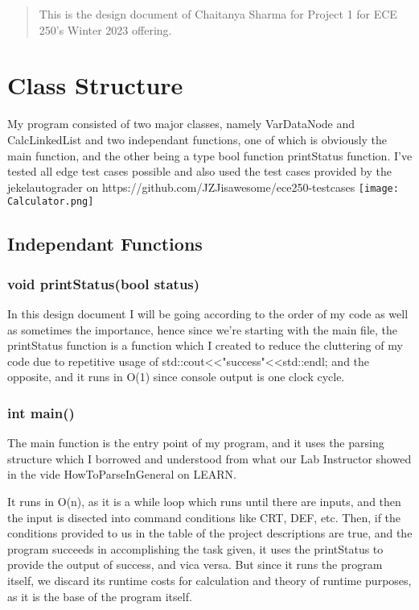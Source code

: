 \begin{abstract}
    This is the design document of Chaitanya Sharma 
    for Project 1 for ECE 250's Winter 2023 offering.
\end{abstract}
\section{Class Structure}
    My program consisted of two major classes, namely {\color{draculapurple}VarDataNode} and 
    {\color{draculapurple}CalcLinkedList} and two independant functions, 
    one of which is obviously the {\color{draculapurple}main} function, and the other being a type 
    bool function {\color{draculapurple}printStatus} function. I've tested all edge test cases possible and also used the test cases provided by the jekelautograder on https://github.com/JZJisawesome/ece250-testcases
    \newline
    \texttt{[image: Calculator.png]}
    \subsection{\color{lightgray}Independant Functions}
    \subsubsection{{\color{orange}void} {\color{draculapurple}printStatus}({\color{orange}bool} {\color{yellow} status})}
    In this design document I will be going according to the order of my 
    code as well as sometimes the importance, hence since we're starting with the main file, the printStatus 
    function is a function which I created to reduce the cluttering of my 
    code due to repetitive usage of std::cout<<"success"<<std::endl; 
    and the opposite, and it runs in {\color{lightblue}O(1)} 
    since console output is one clock cycle.
    \subsubsection{{\color{orange} int} \color{draculapurple}main()}
    The main function is the entry point of my program, and it uses the 
    parsing structure which I borrowed and understood from what our Lab Instructor showed 
    in the vide HowToParseInGeneral on LEARN.

    It runs in {\color{lightblue}O(n)}, as it is a while loop which runs until there are 
    inputs, and then the input is disected into command conditions like 
    CRT, DEF, etc. Then, if the conditions provided to us in the table of 
    the project descriptions are true, and the program succeeds in 
    accomplishing the task given, it uses the {\color{draculapurple}printStatus} 
    to provide the output of success, and vica versa. But since it runs the program itself, 
    we discard its runtime costs for calculation and theory of runtime purposes, 
    as it is the base of the program itself.
